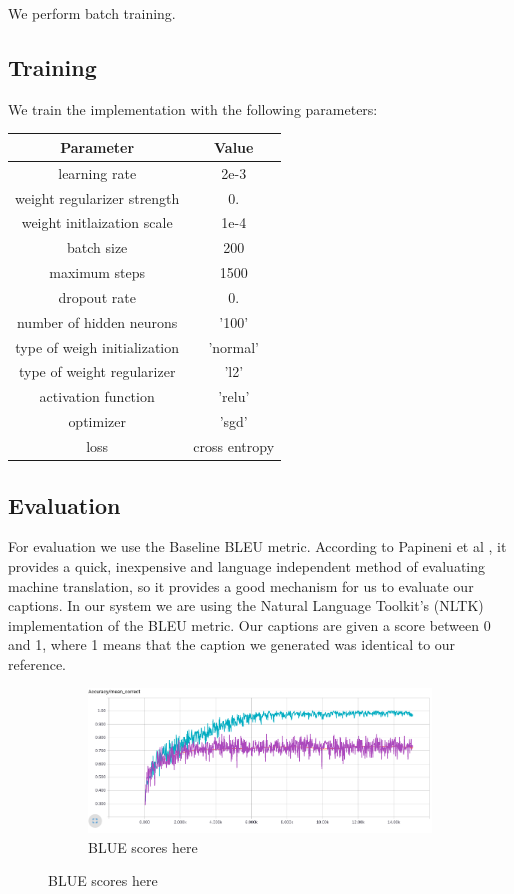 \documentclass{article}
\begin{document}
We perform batch training. 

\subsection{Training}

We train the implementation with the following parameters: 

\begin{tabular}{|c|c|}
\hline
\textbf{Parameter} & \textbf{Value}\\ \hline \hline
learning rate & 2e-3 \\ \hline
weight regularizer strength & 0. \\ \hline
weight initlaization scale & 1e-4 \\ \hline
batch size & 200 \\ \hline
maximum steps & 1500 \\ \hline
dropout rate & 0. \\ \hline
number of hidden neurons & '100' \\ \hline
type of weigh initialization & 'normal' \\ \hline
type of weight regularizer & 'l2' \\ \hline
activation function & 'relu' \\ \hline
optimizer & 'sgd' \\ \hline
loss & cross entropy \\ \hline
\end{tabular}

\subsection{Evaluation}
For evaluation we use the Baseline BLEU metric. According to Papineni et al \cite{papineni2002bleu}, it provides a quick, inexpensive and language independent method of evaluating machine translation, so it provides a good mechanism for us to evaluate our captions. In our system we are using the Natural Language Toolkit's (NLTK) implementation of the BLEU metric. Our captions are given a score between 0 and 1, where 1 means that the caption we generated was identical to our reference.

\begin{figure}[H]
	\centering
	\begin{subfigure}{\textwidth}
		\centering
		\includegraphics[width=0.75\linewidth]{./images/accuracy.png}
		\caption{BLUE scores here}
	\end{subfigure}
\end{figure}
\end{document}
